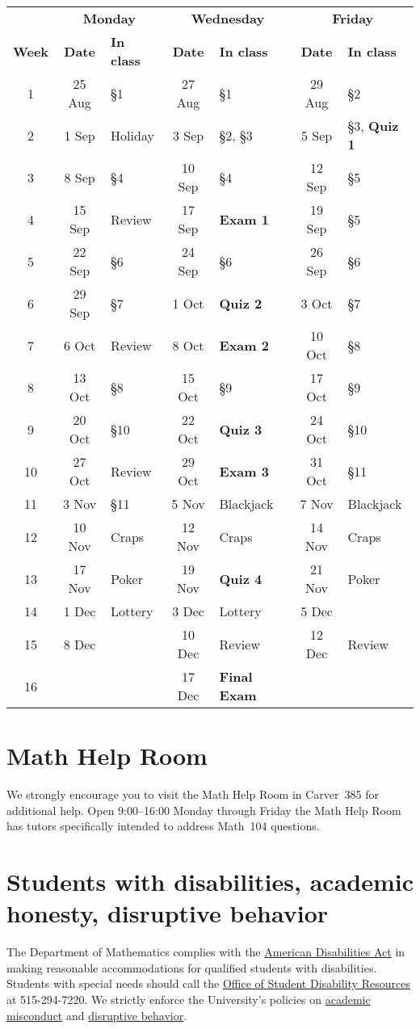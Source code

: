 \documentclass[11pt]{article}
\begin{document}
\begin{tabular}{c|cl|cl|cl}
&\multicolumn{2}{c|}{\bf Monday}
&\multicolumn{2}{c|}{\bf Wednesday}
&\multicolumn{2}{c}{\bf Friday}\\
{\bf Week}&{\bf Date}&{\bf In class}
&{\bf Date}&{\bf In class}&{\bf Date}&{\bf In class}\\\toprule
1&25 Aug&\S1&27 Aug&\S1&29 Aug&\S2\\\midrule
2&1 Sep&Holiday&3 Sep&\S2, \S3&5 Sep&\S3, {\bf Quiz 1}\\\midrule
3&8 Sep&\S4&10 Sep&\S4&12 Sep&\S5\\\midrule
4&15 Sep&Review&17 Sep&{\bf Exam 1}&19 Sep&\S5\\\midrule
5&22 Sep&\S6&24 Sep&\S6&26 Sep&\S6\\\midrule
6&29 Sep&\S7&1 Oct&{\bf Quiz 2}&3 Oct&\S7\\\midrule
7&6 Oct&Review&8 Oct&{\bf Exam 2}&10 Oct&\S8\\\midrule
8&13 Oct&\S8&15 Oct&\S9&17 Oct&\S9\\\midrule
9&20 Oct&\S10&22 Oct&{\bf Quiz 3}&24 Oct&\S10\\\midrule
10&27 Oct&Review&29 Oct&{\bf Exam 3}&31 Oct&\S11\\\midrule
11&3 Nov&\S11&5 Nov&Blackjack&7 Nov&Blackjack\\\midrule
12&10 Nov&Craps&12 Nov&Craps&14 Nov&Craps\\\midrule
13&17 Nov&Poker&19 Nov&{\bf Quiz 4}&21 Nov&Poker\\\midrule
14&1 Dec&Lottery&3 Dec&Lottery&5 Dec&\\\midrule
15&8 Dec&&10 Dec&Review&12 Dec&Review\\\midrule
16&&&17 Dec&{\bf Final Exam}&&
\end{tabular}

\section{Math Help Room}\label{MathCenter}
We strongly encourage you to visit the Math Help Room
in Carver~385 for additional help.
Open 9:00--16:00 Monday through Friday the Math Help Room
has tutors specifically intended to address Math~104 questions.

\section{Students with disabilities, academic honesty, disruptive behavior}
The Department of Mathematics complies with the 
\href{http://www.ada.gov}{American Disabilities Act} in making reasonable 
accommodations for qualified students with disabilities.  Students with 
special needs should call the 
\href{http://www.dso.iastate.edu/dr}{Office of Student Disability Resources} at
515-294-7220.
We strictly enforce the University's policies on 
\href{http://www.dso.iastate.edu/ja/academic/misconduct}{academic misconduct}
and \href{http://www.dso.iastate.edu/sa/issuesconcerns/disruption}
{disruptive behavior}.
\end{document}
